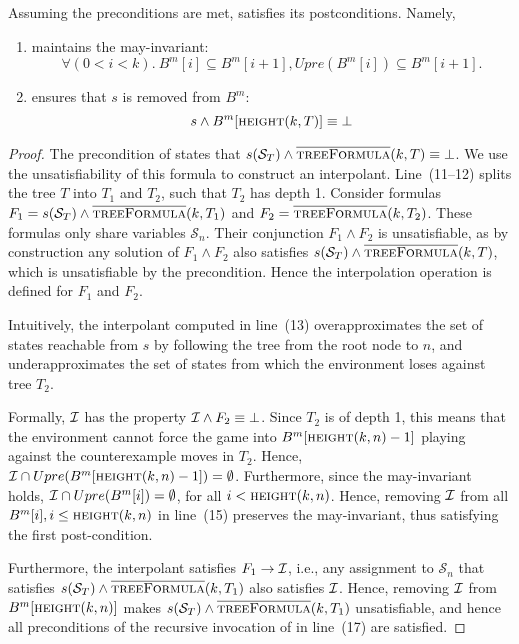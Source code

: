 \begin{proposition}\label{prop:opplearn}
    Assuming the preconditions are met,  satisfies its postconditions. Namely,
    \begin{enumerate}
        \item {} maintains the may-invariant: $$\forall (0<i<k).~B^m[i] \subseteq B^m[i+1], Upre(B^m[i]) \subseteq B^m[i+1].$$
        \item {} ensures that $s$ is removed from $B^m$: $$s \land B^m[\textsc{height}(k, T)] \equiv \bot$$
    \end{enumerate}
\end{proposition}
\begin{proof}
    The precondition of  states that $s(\mathcal{S}_T) \land \textsc{$\overline{\mbox{treeFormula}}$}(k, T) \equiv \bot$. We use the unsatisfiability of this formula to construct an interpolant.  Line~(11--12) splits the tree $T$ into $T_1$ and $T_2$, such that $T_2$ has depth 1.  Consider formulas $F_1=s(\mathcal{S}_T) \land \textsc{$\overline{\mbox{treeFormula}}$}(k, T_1)$ and $F_2 = \textsc{$\overline{\mbox{treeFormula}}$}(k, T_2)$.  These formulas only share variables $\mathcal{S}_n$.  Their conjunction $F_1 \land F_2$ is unsatisfiable, as by construction any solution of $F_1 \land F_2$ also satisfies $s(\mathcal{S}_T) \land \textsc{$\overline{\mbox{treeFormula}}$}(k, T)$, which is unsatisfiable by the precondition.  Hence the interpolation operation is defined for $F_1$ and $F_2$.  

Intuitively, the interpolant computed in line~(13) overapproximates the set of states reachable from $s$ by following the tree from the root node to $n$, and underapproximates the set of states from which the environment loses against tree $T_2$.  

Formally, $\mathcal{I}$ has the property $\mathcal{I} \land F_2 \equiv \bot$.  Since $T_2$ is of depth 1, this means that the environment cannot force the game into $B^m[\textsc{height}(k, n)-1]$ playing against the counterexample moves in $T_2$.  Hence, $\mathcal{I} \cap Upre(B^m[\textsc{height}(k, n)-1]) = \emptyset$.  Furthermore, since the may-invariant holds, $\mathcal{I} \cap Upre(B^m[i]) = \emptyset$, for all $i < \textsc{height}(k, n)$.  Hence, removing $\mathcal{I}$ from all $B^m[i], i\leq \textsc{height}(k, n)$ in line~(15) preserves the may-invariant, thus satisfying the first post-condition.

Furthermore, the interpolant satisfies $F_1 \rightarrow \mathcal{I}$, i.e., any assignment to $\mathcal{S}_n$ that satisfies $s(\mathcal{S}_T) \land \textsc{$\overline{\mbox{treeFormula}}$}(k, T_1)$ also satisfies $\mathcal{I}$.  Hence, removing $\mathcal{I}$ from $B^m[\textsc{height}(k, n)]$ makes $s(\mathcal{S}_T) \land \textsc{$\overline{\mbox{treeFormula}}$}(k, T_1)$ unsatisfiable, and hence all preconditions of the recursive invocation of \textsc{} in line~(17) are satisfied.  


\end{proof}
